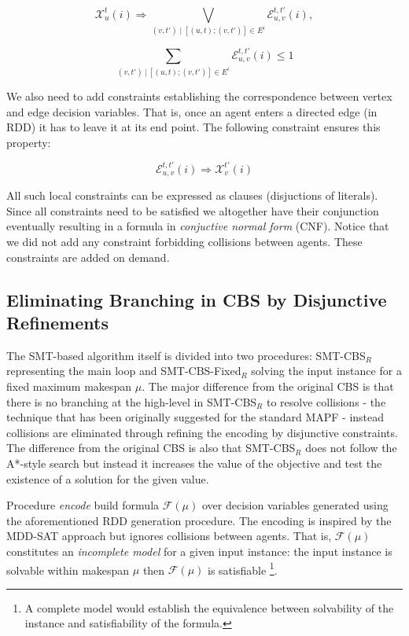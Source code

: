 \begin{equation}
   {  \mathcal{X}_u^t(i) \Rightarrow \bigvee_{(v,t')\;|\;[(u,t);(v,t')] \in E^i}{\mathcal{E}^{t,t'}_{u,v}(i)},
   }
   \label{eq-1}
\end{equation}

\begin{equation}
   {  \sum_{(v,t')\:|\:[(u,t);(v,t')] \in E^i }{\mathcal{E}_{u,v}^{t,t'}{(i)} \leq 1}
   }
   \label{eq-2}
\end{equation}

We also need to add constraints establishing the correspondence between vertex and edge decision variables. That is, once an agent enters a directed edge (in RDD) it has to leave it at its end point. The following constraint ensures this property:

\begin{equation}
   {  \mathcal{E}_{u,v}^{t,t'}(i) \Rightarrow \mathcal{X}_v^{t'}(i)
   }
   \label{eq-3}
\end{equation}

All such local constraints can be expressed as clauses (disjuctions of literals). Since all constraints need to be satisfied we altogether have their conjunction eventually resulting in a formula in {\em conjuctive normal form} (CNF). Notice that we did not add any constraint forbidding collisions between agents. These constraints are added on demand.

\subsection{Eliminating Branching in CBS by Disjunctive Refinements}

The SMT-based algorithm itself is divided into two procedures: SMT-CBS$_R$ representing the main loop and SMT-CBS-Fixed$_R$ solving the input \mapfr instance for a fixed maximum makespan $\mu$. The major difference from the original CBS is that there is no branching at the high-level in SMT-CBS$_R$ to resolve collisions - the technique that has been originally suggested for the standard MAPF \cite{DBLP:conf/ijcai/Surynek19} - instead collisions are eliminated through refining the encoding by disjunctive constraints. The difference from the original CBS is also that SMT-CBS$_R$ does not follow the A*-style search but instead it increases the value of the objective and test the existence of a solution for the given value.

Procedure {\em encode} build formula $\mathcal{F}(\mu)$ over decision variables generated using the aforementioned RDD generation procedure. The encoding is inspired by the MDD-SAT approach but ignores collisions between agents. That is, $\mathcal{F}(\mu)$ constitutes an {\em incomplete model} for a given input instance: the input instance is solvable within makespan $\mu$ then $\mathcal{F}(\mu)$ is satisfiable \footnote{A complete model would establish the equivalence between solvability of the \mapfr instance and satisfiability of the formula.}.

